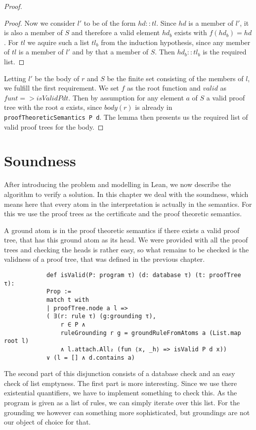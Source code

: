 \documentclass{article}
\begin{document}
\begin{proof}
\begin{proof}
                Now we consider $l'$ to be of the form $hd::tl$. Since $hd$ is a member of $l'$, it is also a member of $S$ and therefore a valid element $hd_b$ exists with $f(hd_b) = hd$. For $tl$ we aquire such a list $tl_b$ from the induction hypothesis, since any member of $tl$ is a member of $l'$ and by that a member of $S$. Then $hd_b::tl_b$ is the required list.
            \end{proof}

            Letting $l'$ be the body of $r$ and $S$ be the finite set consisting of the members of $l$, we fulfill the first requirement. We set $f$ as the root function and $valid$ as $fun t => isValid P d t$. Then by assumption for any element $a$ of $S$ a valid proof tree with the root $a$ exists, since $body(r)$ is already in \texttt{proofTheoreticSemantics P d}. The lemma then presents us the required list of valid proof trees for the body.
        \end{proof}

        


    \section{Soundness}
        After introducing the problem and modelling in Lean, we now describe the algorithm to verify a solution. In this chapter we deal with the soundness, which means here that every atom in the interpretation is actually in the semantics. For this we use the proof trees as the certificate and the proof theoretic semantics.

        A ground atom is in the proof theoretic semantics if there exists a valid proof tree, that has this ground atom as its head. We were provided with all the proof trees and checking the heads is rather easy, so what remains to be checked is the validness of a proof tree, that was defined in the previous chapter.

        \begin{lstlisting}
            def isValid(P: program τ) (d: database τ) (t: proofTree τ): 
            Prop :=
            match t with
            | proofTree.node a l => 
            ( ∃(r: rule τ) (g:grounding τ), 
                r ∈ P ∧ 
                ruleGrounding r g = groundRuleFromAtoms a (List.map root l)
                ∧ l.attach.All₂ (fun ⟨x, _h⟩ => isValid P d x)) 
            ∨ (l = [] ∧ d.contains a)
        \end{lstlisting}

        The second part of this disjunction consists of a database check and an easy check of list emptyness. The first part is more interesting. Since we use there existential quantifiers, we have to implement something to check this. As the program is given as a list of rules, we can simply iterate over this list. For the grounding we however can something more sophisticated, but groundings are not our object of choice for that.
\end{document}
